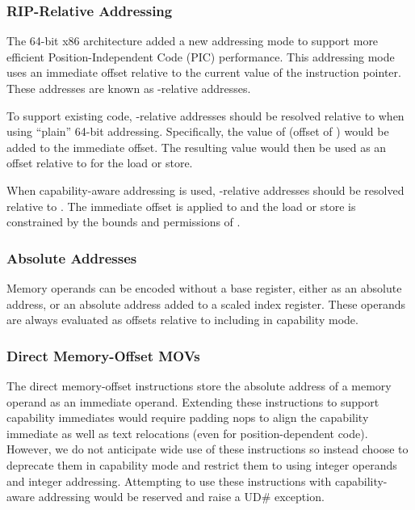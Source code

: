 \subsubsection{RIP-Relative Addressing}

The 64-bit x86 architecture added a new addressing mode to support more
efficient Position-Independent Code (PIC) performance.
This addressing mode uses an immediate offset
relative to the current value of the instruction
pointer.  These addresses are known as \RIP{}-relative addresses.

To support existing code, \RIP{}-relative addresses should be resolved
relative to \DDC{} when using ``plain'' 64-bit addressing.
Specifically, the value of \RIP{} (offset of \CIP{}) would be added to
the immediate offset.  The resulting value would then be used as an
offset relative to \DDC{} for the load or store.

When capability-aware addressing is used, \RIP{}-relative addresses
should be resolved relative to \CIP{}.
The immediate offset is applied to \CIP{} and the load
or store is constrained by the bounds and permissions of \CIP{}.

\subsubsection{Absolute Addresses}

Memory operands can be encoded without a base register, either as an
absolute address, or an absolute address added to a scaled index
register.  These operands are always evaluated as offsets relative to
\DDC{} including in capability mode.

\subsubsection{Direct Memory-Offset MOVs}

The direct memory-offset  instructions store the
absolute address of a memory operand as an immediate operand.
Extending these instructions to support capability immediates would
require padding nops to align the capability immediate as well as text
relocations (even for position-dependent code).  However, we do not
anticipate wide use of these instructions so instead choose to
deprecate them in capability mode and restrict them to using integer
operands and integer addressing.  Attempting to use these instructions
with capability-aware addressing would be reserved and raise a UD\#
exception.

